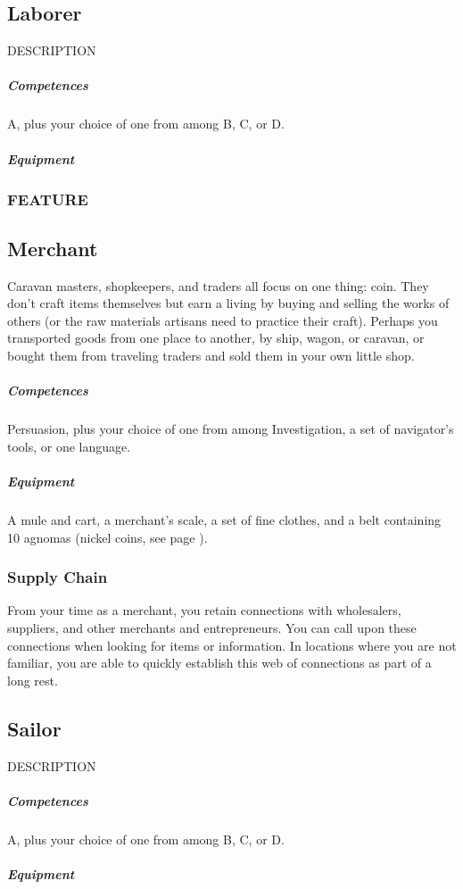 \subsection*{Laborer} \label{ssec::laborer}
    DESCRIPTION
    \subparagraph{Competences} A, plus your choice of one from among B, C, or D.
    \subparagraph{Equipment}
    \subsubsection{FEATURE}

\subsection*{Merchant} \label{ssec::merchant}
    Caravan masters, shopkeepers, and traders all focus on one thing: coin.
    They don't craft items themselves but earn a living by buying and selling the works of others (or the raw materials artisans need to practice their craft).
    Perhaps you transported goods from one place to another, by ship, wagon, or caravan, or bought them from traveling traders and sold them in your own little shop.
    \subparagraph{Competences} Persuasion, plus your choice of one from among Investigation, a set of navigator's tools, or one language.
    \subparagraph{Equipment} A mule and cart, a merchant's scale, a set of fine clothes, and a belt containing 10 agnomas (nickel coins, see page \pageref{sec::currency}).
    \subsubsection{Supply Chain} \label{feat::supplychain}
        From your time as a merchant, you retain connections with wholesalers, suppliers, and other merchants and entrepreneurs.
        You can call upon these connections when looking for items or information.
        In locations where you are not familiar, you are able to quickly establish this web of connections as part of a long rest.

\subsection*{Sailor} \label{ssec::sailor}
    DESCRIPTION
    \subparagraph{Competences} A, plus your choice of one from among B, C, or D.
    \subparagraph{Equipment}
